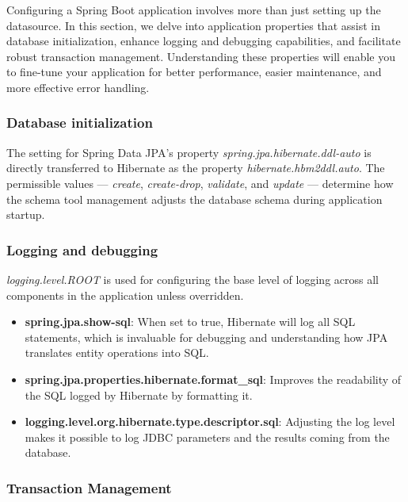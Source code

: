 Configuring a Spring Boot application involves more than just setting up the datasource. In this section, we delve into application properties that assist in database initialization, enhance logging and debugging capabilities, and facilitate robust transaction management. Understanding these properties will enable you to fine-tune your application for better performance, easier maintenance, and more effective error handling.

\subsubsection{Database initialization}

The setting for Spring Data JPA's property \textit{spring.jpa.hibernate.ddl-auto} is directly transferred to Hibernate as the property \textit{hibernate.hbm2ddl.auto}. The permissible values — \textit{create}, \textit{create-drop}, \textit{validate}, and \textit{update} — determine how the schema tool management adjusts the database schema during application startup.


\subsubsection{Logging and debugging}

\textit{logging.level.ROOT} is used for configuring the base level of logging across all components in the application unless overridden.

\begin{itemize}
\item \textbf{spring.jpa.show-sql}: When set to true, Hibernate will log all SQL statements, which is invaluable for debugging and understanding how JPA translates entity operations into SQL.

\item \textbf{spring.jpa.properties.hibernate.format\_sql}: Improves the readability of the SQL logged by Hibernate by formatting it.

\item \textbf{logging.level.org.hibernate.type.descriptor.sql}: Adjusting the log level makes it possible to log JDBC parameters and the results coming from the database.
\end{itemize}



\subsubsection{Transaction Management}

